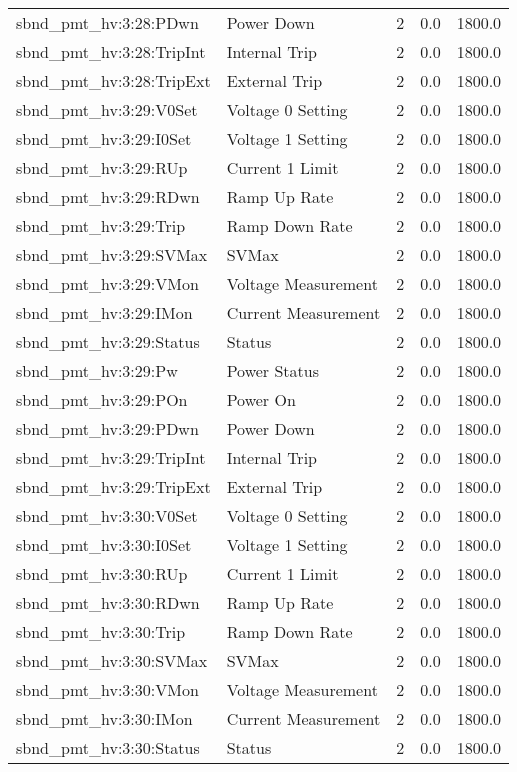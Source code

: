 \begin{center}
\begin{longtable}{l | l l l l }
sbnd\_pmt\_hv:3:28:PDwn & Power Down & 2 & 0.0 & 1800.0\\ 
sbnd\_pmt\_hv:3:28:TripInt & Internal Trip & 2 & 0.0 & 1800.0\\ 
sbnd\_pmt\_hv:3:28:TripExt & External Trip & 2 & 0.0 & 1800.0\\ 
sbnd\_pmt\_hv:3:29:V0Set & Voltage 0 Setting & 2 & 0.0 & 1800.0\\ 
sbnd\_pmt\_hv:3:29:I0Set & Voltage 1 Setting & 2 & 0.0 & 1800.0\\ 
sbnd\_pmt\_hv:3:29:RUp & Current 1 Limit & 2 & 0.0 & 1800.0\\ 
sbnd\_pmt\_hv:3:29:RDwn & Ramp Up Rate & 2 & 0.0 & 1800.0\\ 
sbnd\_pmt\_hv:3:29:Trip & Ramp Down Rate & 2 & 0.0 & 1800.0\\ 
sbnd\_pmt\_hv:3:29:SVMax & SVMax & 2 & 0.0 & 1800.0\\ 
sbnd\_pmt\_hv:3:29:VMon & Voltage Measurement & 2 & 0.0 & 1800.0\\ 
sbnd\_pmt\_hv:3:29:IMon & Current Measurement & 2 & 0.0 & 1800.0\\ 
sbnd\_pmt\_hv:3:29:Status & Status & 2 & 0.0 & 1800.0\\ 
sbnd\_pmt\_hv:3:29:Pw & Power Status & 2 & 0.0 & 1800.0\\ 
sbnd\_pmt\_hv:3:29:POn & Power On & 2 & 0.0 & 1800.0\\ 
sbnd\_pmt\_hv:3:29:PDwn & Power Down & 2 & 0.0 & 1800.0\\ 
sbnd\_pmt\_hv:3:29:TripInt & Internal Trip & 2 & 0.0 & 1800.0\\ 
sbnd\_pmt\_hv:3:29:TripExt & External Trip & 2 & 0.0 & 1800.0\\ 
sbnd\_pmt\_hv:3:30:V0Set & Voltage 0 Setting & 2 & 0.0 & 1800.0\\ 
sbnd\_pmt\_hv:3:30:I0Set & Voltage 1 Setting & 2 & 0.0 & 1800.0\\ 
sbnd\_pmt\_hv:3:30:RUp & Current 1 Limit & 2 & 0.0 & 1800.0\\ 
sbnd\_pmt\_hv:3:30:RDwn & Ramp Up Rate & 2 & 0.0 & 1800.0\\ 
sbnd\_pmt\_hv:3:30:Trip & Ramp Down Rate & 2 & 0.0 & 1800.0\\ 
sbnd\_pmt\_hv:3:30:SVMax & SVMax & 2 & 0.0 & 1800.0\\ 
sbnd\_pmt\_hv:3:30:VMon & Voltage Measurement & 2 & 0.0 & 1800.0\\ 
sbnd\_pmt\_hv:3:30:IMon & Current Measurement & 2 & 0.0 & 1800.0\\ 
sbnd\_pmt\_hv:3:30:Status & Status & 2 & 0.0 & 1800.0\\ 

\end{longtable}
\end{center}
